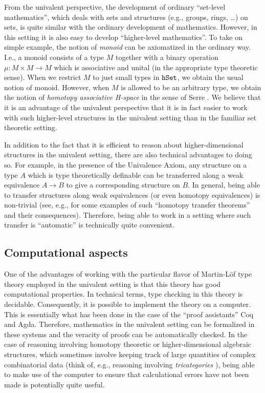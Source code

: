 \documentclass[11pt]{amsart}
\newcommand{\hset}{\textnormal{\texttt{hSet}}}
\theoremstyle{definition}
\theoremstyle{remark}
\numberwithin{equation}{section}
\begin{document}
From the univalent perspective, the development of ordinary ``set-level
mathematics'', which deals with sets and structures (e.g., groups,
rings, \ldots) on sets, is quite similar with the ordinary development
of mathematics.  However, in this setting it is also easy to develop
``higher-level mathematics''.  To take on simple example, the notion of
\emph{monoid} can be axiomatized in the ordinary way.  I.e., a monoid
consists of a type $M$ together with a binary operation $\mu:M\times
M\to M$ which is associative and unital (in the appropriate type
theoretic sense).  When we restrict $M$ to just
small types in $\hset$, we obtain the usual notion of monoid.
However, when $M$ is allowed to be an arbitrary type, we obtain the
notion of \emph{homotopy associative H-space} in the sense of Serre
\cite{Serre:1951uf}.  We believe that it is an advantage of the
univalent perspective that it is in fact easier to work with such
higher-level structures in the univalent setting than in the familiar
set theoretic setting.

In addition to the fact that it is efficient to reason about
higher-dimensional structures in the univalent setting, there are also
technical advantages to doing so.  For example, in the presence of the
Univalence Axiom, any structure on a type $A$ which is type
theoretically definable can be transferred along a weak equivalence
$A\to B$ to give a corresponding structure on $B$.  In general, being
able to transfer structures along weak equivalences (or even homotopy
equivalences) is non-trivial (see, e.g., \cite{Loday:2012vi} for some
examples of such ``homotopy transfer theorems'' and their
consequences).  Therefore, being able to work in a setting where such
transfer is ``automatic'' is technically quite convenient.

\subsection{Computational aspects}\label{section:computational}

One of the advantages of working with the particular flavor of
Martin-L\"{o}f type theory employed in the univalent setting is that
this theory has good computational properties.  In technical terms,
type checking in this theory is decidable.  Consequently, it is
possible to implement the theory on a computer.  This is essentially
what has been done in the case of the ``proof assistants'' Coq and
Agda. Therefore, mathematics in the univalent setting can be
formalized in these systems and the veracity of proofs can be
automatically checked.  In the case of reasoning involving homotopy
theoretic or higher-dimensional algebraic structures, which sometimes
involve keeping track of large quantities of complex combinatorial
data (think of, e.g., reasoning involving \emph{tricategories}
\cite{Gordon:CT}), being able to make use of the computer to ensure
that calculational errors have not been made is potentially quite
useful.
\end{document}
